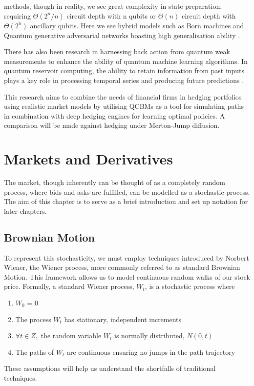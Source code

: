 \documentclass[12pt]{article}
\newcommand{\newp}
    {
    \vskip 0.5cm 
  }
\numberwithin{equation}{section}
\begin{document}
methods, though in reality, we see great complexity in state preparation, requiring 
$\Theta(2^n/n)$ circuit depth with n qubits or $\Theta(n)$ circuit depth with 
$\Theta(2^n)$ ancillary qubits\autocite{zhang_quantum_2022}. Here we see hybrid 
models such as Born machines
and Quantum generative adversarial networks boasting high generalisation ability
\autocite{ganguly_implementing_nodate,gili_2022_do,horowitz_quantum_2022}.
\newp
There has also been research in harnessing back action from quantum weak 
measurements to enhance the ability of quantum machine learning algorithms. 
In quantum reservoir computing,
the ability to retain information from past inputs plays a key role in processing 
temporal series and producing future predictions
\autocite{franceschetto_harnessing_2024,fujii_quantum_2020,garcia-beni_squeezing_2024,mujal_time-series_2023}.
\newp
This research aims to combine the needs of financial firms in hedging portfolios
using realistic market models by utilising QCBMs as a tool 
for simulating paths in combination with deep hedging engines for learning 
optimal policies. A comparison will be made against hedging under Merton-Jump 
diffusion. 
\clearpage
\section{Markets and Derivatives}
The market, though inherently can be thought of as a completely random process,
where bids and asks are fulfilled, can be modelled as a stochastic process. The 
aim of this chapter is to serve as a brief introduction and set up notation for 
later chapters. 

\subsection{Brownian Motion}
To represent this stochasticity, we must employ techniques introduced by Norbert 
Wiener, the Wiener process, more commonly referred to as standard Brownian Motion. 
This framework allows us to model continuous random 
walks of our stock price. Formally, a standard Wiener process, $W_t$, is a stochastic 
process where 
\begin{enumerate}
  \item $W_0$ = 0
  \item The process $W_t$ has stationary, independent increments
  \item $\forall t \in Z,$ the random variable $W_t$ is normally distributed, $N(0,t)$ 
  \item The paths of $W_t$ are continuous ensuring no jumps in the path trajectory
\end{enumerate}
These assumptions will help us understand the shortfalls of traditional techniques.
\end{document}
